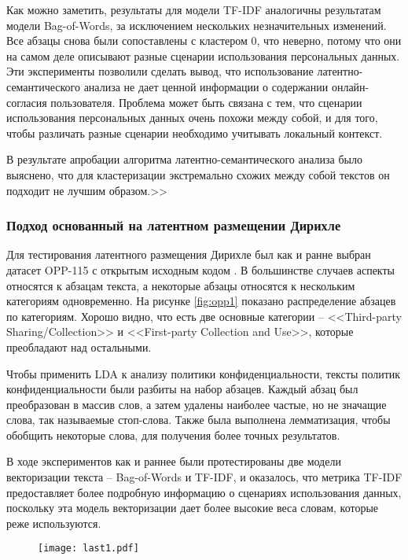 \documentclass[../main]{subfiles}
\begin{document}
Как можно заметить, результаты для модели TF-IDF аналогичны результатам модели Bag-of-Words, за исключением нескольких незначительных изменений. Все абзацы снова были сопоставлены с кластером 0, что неверно, потому что они на самом деле описывают разные сценарии использования персональных данных. Эти эксперименты позволили сделать вывод, что использование латентно-семантического анализа не дает ценной информации о содержании онлайн-согласия пользователя. Проблема может быть связана с тем, что сценарии использования персональных данных очень похожи между собой, и для того, чтобы различать разные сценарии необходимо учитывать локальный контекст.

В результате апробации алгоритма латентно-семантического анализа было выяснено, что для кластеризации экстремально схожих между собой текстов он подходит не лучшим образом.>> \cite{LETI}

\subsubsection{Подход основанный на латентном размещении Дирихле}

Для тестирования латентного размещения Дирихле был как и ранне выбран датасет OPP-115 с открытым исходным кодом \cite{MDPI18}. В большинстве случаев аспекты относятся к абзацам текста, а некоторые абзацы относятся к нескольким категориям одновременно. На рисунке \ref{fig:opp1} показано распределение абзацев по категориям. Хорошо видно, что есть две основные категории – <<Third-party Sharing/Collection>> и <<First-party Collection and Use>>, которые преобладают над остальными.

Чтобы применить LDA к анализу политики конфиденциальности, тексты политик конфиденциальности были разбиты на набор абзацев. Каждый абзац был преобразован в массив слов, а затем удалены наиболее частые, но не значащие слова, так называемые стоп-слова. Также была выполнена лемматизация, чтобы обобщить некоторые слова, для получения более точных результатов.

В ходе экспериментов как и раннее были протестированы две модели векторизации текста – Bag-of-Words и TF-IDF, и оказалось, что метрика TF-IDF предоставляет более подробную информацию о сценариях использования данных, поскольку эта модель векторизации дает более высокие веса словам, которые реже используются.

\begin{figure}[H]
    \centering
    {\texttt{[image: last1.pdf]}}
    \vspace{-\baselineskip}
\end{figure}
\end{document}
